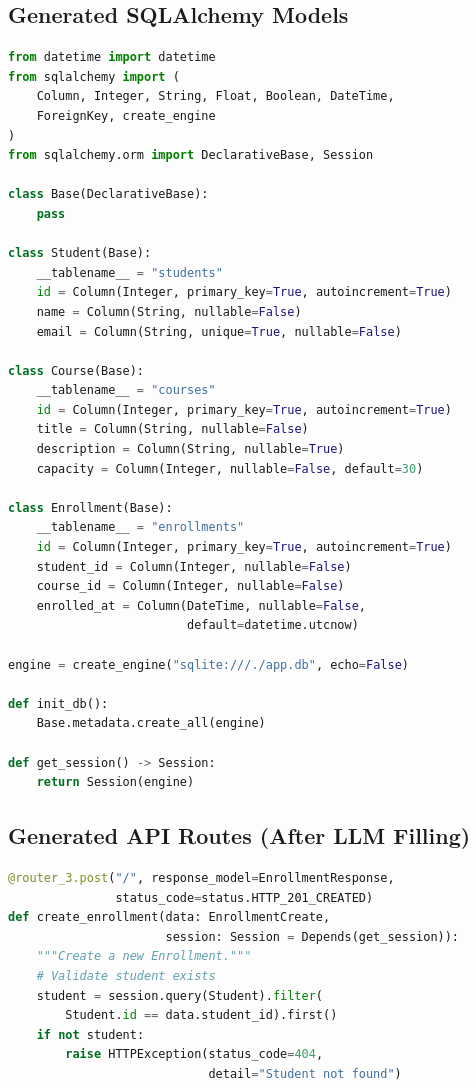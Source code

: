 \documentclass[11pt,a4paper]{article}
\begin{document}
{\subsection{Generated SQLAlchemy Models}

\begin{lstlisting}[language=Python, caption={Generated models.py for the small model}]
from datetime import datetime
from sqlalchemy import (
    Column, Integer, String, Float, Boolean, DateTime,
    ForeignKey, create_engine
)
from sqlalchemy.orm import DeclarativeBase, Session

class Base(DeclarativeBase):
    pass

class Student(Base):
    __tablename__ = "students"
    id = Column(Integer, primary_key=True, autoincrement=True)
    name = Column(String, nullable=False)
    email = Column(String, unique=True, nullable=False)

class Course(Base):
    __tablename__ = "courses"
    id = Column(Integer, primary_key=True, autoincrement=True)
    title = Column(String, nullable=False)
    description = Column(String, nullable=True)
    capacity = Column(Integer, nullable=False, default=30)

class Enrollment(Base):
    __tablename__ = "enrollments"
    id = Column(Integer, primary_key=True, autoincrement=True)
    student_id = Column(Integer, nullable=False)
    course_id = Column(Integer, nullable=False)
    enrolled_at = Column(DateTime, nullable=False,
                         default=datetime.utcnow)

engine = create_engine("sqlite:///./app.db", echo=False)

def init_db():
    Base.metadata.create_all(engine)

def get_session() -> Session:
    return Session(engine)
\end{lstlisting}

\subsection{Generated API Routes (After LLM Filling)}

\begin{lstlisting}[language=Python, caption={Generated routes.py excerpt---enrollment creation with business logic}]
@router_3.post("/", response_model=EnrollmentResponse,
               status_code=status.HTTP_201_CREATED)
def create_enrollment(data: EnrollmentCreate,
                      session: Session = Depends(get_session)):
    """Create a new Enrollment."""
    # Validate student exists
    student = session.query(Student).filter(
        Student.id == data.student_id).first()
    if not student:
        raise HTTPException(status_code=404,
                            detail="Student not found")


\end{lstlisting}}
\end{document}

